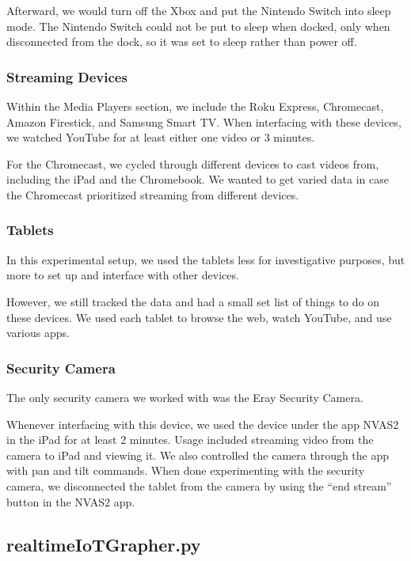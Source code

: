 Afterward, we would turn off the Xbox and put the Nintendo Switch into sleep mode. The Nintendo Switch could not be put to sleep when docked, only when disconnected from the dock, so it was set to sleep rather than power off.

\subsubsection{Streaming Devices}

Within the Media Players section, we include the Roku Express, Chromecast, Amazon Firestick, and Samsung Smart TV. When interfacing with these devices, we watched YouTube for at least either one video or 3 minutes.

For the Chromecast, we cycled through different devices to cast videos from, including the iPad and the Chromebook. We wanted to get varied data in case the Chromecast prioritized streaming from different devices.

\subsubsection{Tablets}
In this experimental setup, we used the tablets less for investigative purposes, but more to set up and interface with other devices.

However, we still tracked the data and had a small set list of things to do on these devices. We used each tablet to browse the web, watch YouTube, and use various apps.

\subsubsection{Security Camera}

The only security camera we worked with was the Eray Security Camera.

Whenever interfacing with this device, we used the device under the app NVAS2 in the iPad for at least 2 minutes. Usage included streaming video from the camera to iPad and viewing it. We also controlled the camera through the app with pan and tilt commands. When done experimenting with the security camera, we disconnected the tablet from the camera by using the ``end stream'' button in the NVAS2 app.

\subsection{realtimeIoTGrapher.py}
\label{realtimeIoTGrapher.py}

